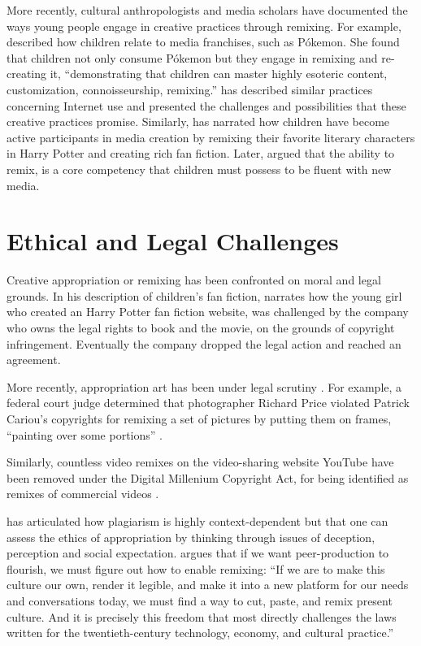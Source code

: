 More recently, cultural anthropologists and media scholars have documented the ways young people engage in creative practices through remixing. 
For example, \citet{ito_technologies_2007} described how children relate to media franchises, such as Pókemon.
She found that children not only consume Pókemon but they engage in remixing and re-creating it, ``demonstrating that children can master highly esoteric content, customization, connoisseurship, remixing.''
\citet{livingstone_taking_2008} has described similar practices concerning Internet use and presented the challenges and possibilities that these creative practices promise.
Similarly, \citet{jenkins_convergence_2006} has narrated how children have become active participants in media creation by remixing their favorite literary characters in Harry Potter and creating rich fan fiction.
Later, \citet{jenkins_confronting_2009} argued that the ability to remix, is a core competency that children must possess to be fluent with new media.

\section{Ethical and Legal Challenges}

Creative appropriation or remixing has been confronted on moral and legal grounds.
In his description of children's fan fiction, \citet{jenkins_convergence_2006} narrates how the young girl who created an Harry Potter fan fiction website, was challenged by the company who owns the legal rights to book and the movie, on the grounds of copyright infringement.
Eventually the company dropped the legal action and reached an agreement.

More recently, appropriation art has been under legal scrutiny \citep{greenberg_art_1992,landes_copyright_2000}. 
For example, a federal court judge determined that photographer Richard Price violated Patrick Cariou’s copyrights for remixing a set of pictures by putting them on frames, ``painting over some portions'' \citep{batts_patrick_2011}.

Similarly, countless video remixes on the video-sharing website YouTube have been removed under the Digital Millenium Copyright Act, for being identified as remixes of commercial videos \citep{seneviratne_remix_2010}.

\citet{posner_little_2007} has articulated how plagiarism is highly context-dependent but that one can assess the ethics of appropriation by thinking through issues of deception, perception and social expectation.
\citet{benkler_wealth_2006} argues that if we want peer-production to flourish, we must figure out how to enable remixing:
``If we are to make this culture our own, render it legible, and make it into a new platform for our needs and conversations today, we must find a way to cut, paste, and remix present culture. And it is precisely this freedom that most directly challenges the laws written for the twentieth-century technology, economy, and cultural practice.''

